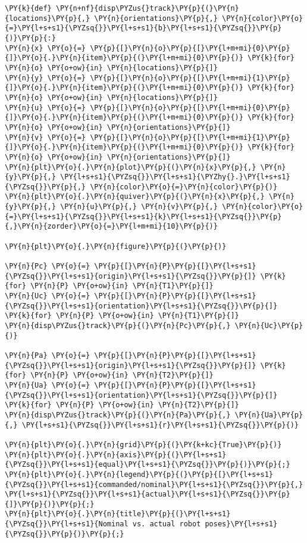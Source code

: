 \documentclass[a4paper]{scrreprt}
\begin{document}
\begin{Verbatim}[commandchars=\\\{\}]
\PY{k}{def} \PY{n+nf}{disp\PYZus{}track}\PY{p}{(}\PY{n}{locations}\PY{p}{,} \PY{n}{orientations}\PY{p}{,} \PY{n}{color}\PY{o}{=}\PY{l+s+s1}{\PYZsq{}}\PY{l+s+s1}{b}\PY{l+s+s1}{\PYZsq{}}\PY{p}{)}\PY{p}{:}
\PY{n}{x} \PY{o}{=} \PY{p}{[}\PY{n}{o}\PY{p}{[}\PY{l+m+mi}{0}\PY{p}{]}\PY{o}{.}\PY{n}{item}\PY{p}{(}\PY{l+m+mi}{0}\PY{p}{)} \PY{k}{for} \PY{n}{o} \PY{o+ow}{in} \PY{n}{locations}\PY{p}{]}
\PY{n}{y} \PY{o}{=} \PY{p}{[}\PY{n}{o}\PY{p}{[}\PY{l+m+mi}{1}\PY{p}{]}\PY{o}{.}\PY{n}{item}\PY{p}{(}\PY{l+m+mi}{0}\PY{p}{)} \PY{k}{for} \PY{n}{o} \PY{o+ow}{in} \PY{n}{locations}\PY{p}{]}
\PY{n}{u} \PY{o}{=} \PY{p}{[}\PY{n}{o}\PY{p}{[}\PY{l+m+mi}{0}\PY{p}{]}\PY{o}{.}\PY{n}{item}\PY{p}{(}\PY{l+m+mi}{0}\PY{p}{)} \PY{k}{for} \PY{n}{o} \PY{o+ow}{in} \PY{n}{orientations}\PY{p}{]}
\PY{n}{v} \PY{o}{=} \PY{p}{[}\PY{n}{o}\PY{p}{[}\PY{l+m+mi}{1}\PY{p}{]}\PY{o}{.}\PY{n}{item}\PY{p}{(}\PY{l+m+mi}{0}\PY{p}{)} \PY{k}{for} \PY{n}{o} \PY{o+ow}{in} \PY{n}{orientations}\PY{p}{]}
\PY{n}{plt}\PY{o}{.}\PY{n}{plot}\PY{p}{(}\PY{n}{x}\PY{p}{,} \PY{n}{y}\PY{p}{,} \PY{l+s+s1}{\PYZsq{}}\PY{l+s+s1}{\PYZhy{}.}\PY{l+s+s1}{\PYZsq{}}\PY{p}{,} \PY{n}{color}\PY{o}{=}\PY{n}{color}\PY{p}{)}
\PY{n}{plt}\PY{o}{.}\PY{n}{quiver}\PY{p}{(}\PY{n}{x}\PY{p}{,} \PY{n}{y}\PY{p}{,} \PY{n}{u}\PY{p}{,} \PY{n}{v}\PY{p}{,} \PY{n}{color}\PY{o}{=}\PY{l+s+s1}{\PYZsq{}}\PY{l+s+s1}{k}\PY{l+s+s1}{\PYZsq{}}\PY{p}{,}\PY{n}{zorder}\PY{o}{=}\PY{l+m+mi}{10}\PY{p}{)}

\PY{n}{plt}\PY{o}{.}\PY{n}{figure}\PY{p}{(}\PY{p}{)}

\PY{n}{Pc} \PY{o}{=} \PY{p}{[}\PY{n}{P}\PY{p}{[}\PY{l+s+s1}{\PYZsq{}}\PY{l+s+s1}{origin}\PY{l+s+s1}{\PYZsq{}}\PY{p}{]} \PY{k}{for} \PY{n}{P} \PY{o+ow}{in} \PY{n}{T1}\PY{p}{]}
\PY{n}{Uc} \PY{o}{=} \PY{p}{[}\PY{n}{P}\PY{p}{[}\PY{l+s+s1}{\PYZsq{}}\PY{l+s+s1}{orientation}\PY{l+s+s1}{\PYZsq{}}\PY{p}{]} \PY{k}{for} \PY{n}{P} \PY{o+ow}{in} \PY{n}{T1}\PY{p}{]}
\PY{n}{disp\PYZus{}track}\PY{p}{(}\PY{n}{Pc}\PY{p}{,} \PY{n}{Uc}\PY{p}{)}

\PY{n}{Pa} \PY{o}{=} \PY{p}{[}\PY{n}{P}\PY{p}{[}\PY{l+s+s1}{\PYZsq{}}\PY{l+s+s1}{origin}\PY{l+s+s1}{\PYZsq{}}\PY{p}{]} \PY{k}{for} \PY{n}{P} \PY{o+ow}{in} \PY{n}{T2}\PY{p}{]}
\PY{n}{Ua} \PY{o}{=} \PY{p}{[}\PY{n}{P}\PY{p}{[}\PY{l+s+s1}{\PYZsq{}}\PY{l+s+s1}{orientation}\PY{l+s+s1}{\PYZsq{}}\PY{p}{]} \PY{k}{for} \PY{n}{P} \PY{o+ow}{in} \PY{n}{T2}\PY{p}{]}
\PY{n}{disp\PYZus{}track}\PY{p}{(}\PY{n}{Pa}\PY{p}{,} \PY{n}{Ua}\PY{p}{,} \PY{l+s+s1}{\PYZsq{}}\PY{l+s+s1}{r}\PY{l+s+s1}{\PYZsq{}}\PY{p}{)}

\PY{n}{plt}\PY{o}{.}\PY{n}{grid}\PY{p}{(}\PY{k+kc}{True}\PY{p}{)}
\PY{n}{plt}\PY{o}{.}\PY{n}{axis}\PY{p}{(}\PY{l+s+s1}{\PYZsq{}}\PY{l+s+s1}{equal}\PY{l+s+s1}{\PYZsq{}}\PY{p}{)}\PY{p}{;} 
\PY{n}{plt}\PY{o}{.}\PY{n}{legend}\PY{p}{(}\PY{p}{[}\PY{l+s+s1}{\PYZsq{}}\PY{l+s+s1}{commanded/nominal}\PY{l+s+s1}{\PYZsq{}}\PY{p}{,} \PY{l+s+s1}{\PYZsq{}}\PY{l+s+s1}{actual}\PY{l+s+s1}{\PYZsq{}}\PY{p}{]}\PY{p}{)}\PY{p}{;} 
\PY{n}{plt}\PY{o}{.}\PY{n}{title}\PY{p}{(}\PY{l+s+s1}{\PYZsq{}}\PY{l+s+s1}{Nominal vs. actual robot poses}\PY{l+s+s1}{\PYZsq{}}\PY{p}{)}\PY{p}{;} 


\end{Verbatim}
\end{document}
